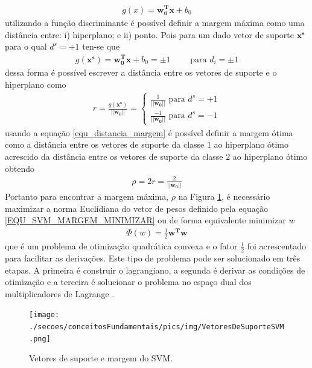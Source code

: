 \begin{align}
g(x) = \mathbf{w^{T}_{0}}\mathbf{x} + b_{0} 							\label{EQU_SVM_FUNCAO_DISCRIMINANTE}
\end{align}
utilizando a função discriminante é possível definir a margem máxima como uma distância entre: i) hiperplano; e ii) ponto. Pois para um dado vetor de suporte \(\mathbf{x^{s}}\) para o qual \(d^{s} = +1\) ten-se que
\begin{align}
g(\mathbf{x^{s}}) = \mathbf{w^{T}_{0}}\mathbf{x} + b_{0} = \pm 1 \qquad \textrm{ para } d_{i} = \pm 1
\end{align}
dessa forma é possível escrever a distância entre os vetores de suporte e o hiperplano como
\begin{align}
r = \frac{g(\mathbf{x^{s}})}{||\mathbf{w_{0}}||} = 	\begin{cases} \label{equ_distancia_margem}
														\frac{1}{||\mathbf{w_{0}}||}  \textrm{ para } d^{s} = +1 \\
														\frac{-1}{||\mathbf{w_{0}}||} \textrm{ para } d^{s} = -1
													\end{cases}
\end{align}
usando a equação \eqref{equ_distancia_margem} é possível definir a margem ótima como a distância entre os vetores de suporte da classe \(1\) ao hiperplano ótimo acrescido da distância entre os vetores de suporte da classe \(2\) ao hiperplano ótimo obtendo
\begin{align}
\rho = 2r = \frac{2}{||\mathbf{w_{0}}||} \label{EQU_SVM_MARGEM_MINIMIZAR}
\end{align}
Portanto para encontrar a margem máxima, \(\rho\) na Figura \ref{FIGURA_SVM_Vetores_Suporte}, é necessário maximizar a norma Euclidiana do vetor de pesos definido pela equação \eqref{EQU_SVM_MARGEM_MINIMIZAR} ou de forma equivalente minimizar \(w\)
\begin{align}  
\Phi(w) = \frac{1}{2}\mathbf{w^{T}}\mathbf{w} \label{EQU_SVM_MARGEM_EQUIVALENTE_MAXIMIZAR}
\end{align}
que é um problema de otimização quadrática convexa e o fator \(\frac{1}{2}\) foi acrescentado para facilitar as derivações. Este tipo de problema pode ser solucionado em três etapas. A primeira é construir o lagrangiano, a segunda é derivar as condições de otimização e a terceira é solucionar o problema no espaço dual dos multiplicadores de Lagrange \cite{Haykin2007}.
\begin{figure}[H]
  \centering
  \caption{Vetores de suporte e margem do SVM.}
  \texttt{[image: ./secoes/conceitosFundamentais/pics/img/VetoresDeSuporteSVM.png]}
  \label{FIGURA_SVM_Vetores_Suporte}
\end{figure}
